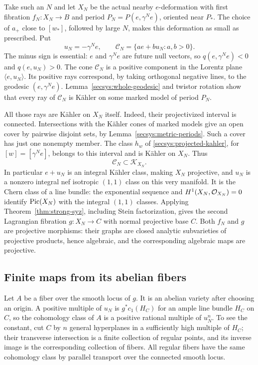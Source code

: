Take such an $N$ and let $X_N$ be the actual nearby $e$-deformation
with first fibration $f_N:X_N\to B$ and period
$P_N=P(e,\gamma^Ne)$, oriented near $P_*$.
The choice of $a_+$ close to $[w_*]$, followed by large $N$, makes
this deformation as small as prescribed.  Put
\begin{equation}\label{secsys:second-class}
 u_N=-\gamma^Ne,\qquad
 \mathcal C_N=\{a e+b u_N:a,b>0\}.
\end{equation}
The minus sign is essential: $e$ and $\gamma^Ne$ are future null
vectors, so $q(e,\gamma^Ne)<0$ and $q(e,u_N)>0$.
The cone $\mathcal C_N$ is a positive component in the Lorentz plane
$\langle e,u_N\rangle$.  Its positive rays correspond, by taking
orthogonal negative lines, to the geodesic $(e,\gamma^Ne)$.
Lemma~\ref{secsys:whole-geodesic} and twistor rotation show that every
ray of $\mathcal C_N$ is K\"ahler on some marked model of period $P_N$.

All those rays are K\"ahler on $X_N$ itself.  Indeed, their projectivized
interval is connected.  Intersections with the K\"ahler cones of marked
models give an open cover by pairwise disjoint sets, by
Lemma~\ref{secsys:metric-periods}.  Such a cover has just one nonempty
member.  The class $h_w$ of \eqref{secsys:projected-kahler}, for
$[w]=[\gamma^Ne]$, belongs to this interval and is K\"ahler on $X_N$.
Thus
\begin{equation}\label{secsys:actual-cone}
                         \mathcal C_N\subset\mathcal K_{X_N}.
\end{equation}
In particular $e+u_N$ is an integral K\"ahler class, making $X_N$
projective, and $u_N$ is a nonzero integral nef isotropic $(1,1)$
class on this very manifold.  It is the Chern class of a line bundle:
the exponential sequence and $H^1(X_N,\mathcal O_{X_N})=0$ identify
$\operatorname{Pic}(X_N)$ with the integral $(1,1)$ classes.  Applying
Theorem~\ref{thm:strong-syz}, including Stein factorization, gives
the second Lagrangian fibration $g:X_N\to C$ with normal projective
base $C$.  Both $f_N$ and $g$ are projective morphisms: their graphs
are closed analytic subvarieties of projective products, hence
algebraic, and the corresponding algebraic maps are projective.

\subsection{Finite maps from its abelian fibers}

Let $A$ be a fiber over the smooth locus of $g$.  It is an abelian
variety after choosing an origin.  A positive multiple of $u_N$ is
$g^*c_1(H_C)$ for an ample line bundle $H_C$ on $C$, so the cohomology
class of $A$ is a positive rational multiple of $u_N^n$.  To see the
constant, cut $C$ by $n$ general hyperplanes in a sufficiently high
multiple of $H_C$; their transverse intersection is a finite collection
of regular points, and its inverse image is the corresponding collection
of fibers.  All regular fibers have the same cohomology class by
parallel transport over the connected smooth locus.

